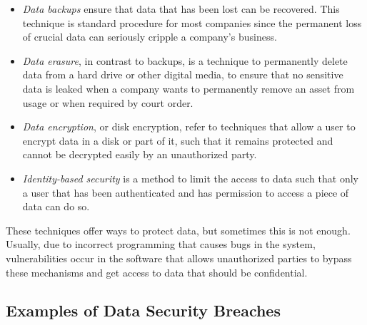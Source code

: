 \begin{itemize}

    \item \textit{Data backups} ensure that data that has been lost can be recovered. This technique is standard procedure for most companies since the permanent loss of crucial data can seriously cripple a company's business.

    \item \textit{Data erasure}, in contrast to backups, is a technique to permanently delete data from a hard drive or other digital media, to ensure that no sensitive data is leaked when a company wants to permanently remove an asset from usage or when required by court order.

    \item \textit{Data encryption}, or disk encryption, refer to techniques that allow a user to encrypt data in a disk or part of it, such that it remains protected and cannot be decrypted easily by an unauthorized party.

    \item \textit{Identity-based security} is a method to limit the access to data such that only a user that has been authenticated and has permission to access a piece of data can do so.


\end{itemize}


These techniques offer ways to protect data, but sometimes this is not enough. Usually, due to incorrect programming that causes bugs in the system, vulnerabilities occur in the software that allows unauthorized parties to bypass these mechanisms and get access to data that should be confidential.



\subsection{Examples of Data Security Breaches} 
\label{ssec:ExamplesDataSecurityBreaches}


